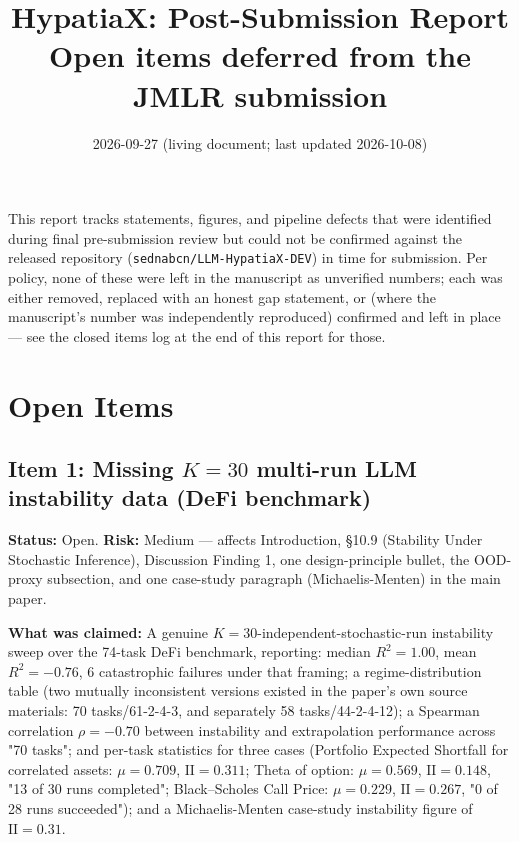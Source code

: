 \documentclass[11pt]{article}
\title{HypatiaX: Post-Submission Report\\
\large Open items deferred from the JMLR submission}
\author{}
\date{2026-09-27 (living document; last updated 2026-10-08)}
\newcommand{\Rsq}{R^{2}}
\newcommand{\II}{\mathrm{II}}
\begin{document}
\maketitle

\noindent This report tracks statements, figures, and pipeline defects that
were identified during final pre-submission review but could not be
confirmed against the released repository (\texttt{sednabcn/LLM-HypatiaX-DEV})
in time for submission. Per policy, none of these were left in the
manuscript as unverified numbers; each was either removed, replaced with an
honest gap statement, or (where the manuscript's number was independently
reproduced) confirmed and left in place — see the closed items log at the
end of this report for those.

\section{Open Items}

\subsection*{Item 1: Missing $K=30$ multi-run LLM instability data (DeFi benchmark)}
\textbf{Status:} Open. \textbf{Risk:} Medium — affects Introduction,
\S10.9 (Stability Under Stochastic Inference), Discussion
Finding 1, one design-principle bullet, the OOD-proxy subsection, and one
case-study paragraph (Michaelis-Menten) in the main paper.

\textbf{What was claimed:} A genuine $K=30$-independent-stochastic-run
instability sweep over the 74-task DeFi benchmark, reporting: median
$\Rsq=1.00$, mean $\Rsq=-0.76$, 6 catastrophic failures under that framing; a
regime-distribution table (two mutually inconsistent versions existed in the
paper's own source materials: 70 tasks/61-2-4-3, and separately 58
tasks/44-2-4-12); a Spearman correlation $\rho=-0.70$ between instability and
extrapolation performance across "70 tasks"; and per-task statistics for
three cases (Portfolio Expected Shortfall for correlated assets: $\mu=0.709$,
$\II=0.311$; Theta of option: $\mu=0.569$, $\II=0.148$, "13 of 30 runs
completed"; Black--Scholes Call Price: $\mu=0.229$, $\II=0.267$, "0 of 28
runs succeeded"); and a Michaelis-Menten case-study instability figure of
$\II=0.31$.
\end{document}
